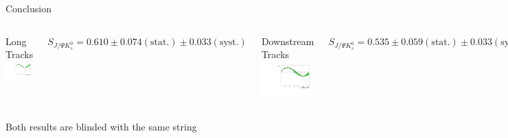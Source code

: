 \documentclass{beamer}
\newcommand{\SJPsi}{S_{J/\Psi K_s^0}}
\begin{document}
\begin{frame}{Conclusion}
	\begin{columns}
	\begin{block}{Long Tracks}
	\centering
	\includegraphics[width=\textwidth]{asymmetry_lt}	
	\end{block}
	$\SJPsi = 0.610 \pm 0.074 (\text{stat.}) \pm 0.033 (\text{syst.})$
	\begin{block}{Downstream Tracks}
	\centering
	\includegraphics[width=\textwidth]{asymmetry_ds}
	\end{block}
	$\SJPsi = 0.535 \pm 0.059 (\text{stat.}) \pm 0.033 (\text{syst.})$
	\end{columns}
    \begin{center}
    Both results are blinded with the same string
    \end{center}
\end{frame}
\end{document}
